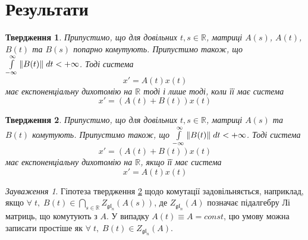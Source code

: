 \documentclass[14pt]{extarticle} %
\let\oldforall\forall
\renewcommand{\forall}{\oldforall\;}
\newtheorem{proposition}{Твердження}
\theoremstyle{remark}
\newtheorem{remark}{Зауваження}
\begin{document}
\section{Результати}
\begin{proposition}\label{weak}Припустимо, що для довільних $t,s\in\mathbb{R}$, матриці $A(s)$, $A(t)$, $B(t)$ та $B(s)$ попарно комутують.
	Припустимо також, що $\int_{-\infty}^\infty\mynorm{B(t)}\;dt<+\infty$. Тоді система 
	\begin{equation}\label{Unperturbed}
	x'=A(t)x(t)
	\end{equation}
	має експоненціальну дихотомію на $\mathbb{R}$ тоді і лише тоді, коли її має система
	\begin{equation}\label{Perturbed}
	x'=(A(t)+B(t))x(t)
	\end{equation}
\end{proposition}
\begin{proposition}
	\label{strong}
	Припустимо, що для довільних $t,s\in\mathbb{R}$, матриці $A(s)$ та $B(t)$ комутують.
	Припустимо також, що $\int_{-\infty}^\infty\mynorm{B(t)}\;dt<+\infty$. Тоді система 
	\begin{equation}\label{Perturbed}
	x'=(A(t)+B(t))x(t)
	\end{equation}
	має експоненціальну дихотомію на $\mathbb{R}$, якщо її має система
	\begin{equation}\label{Unperturbed}
	x'=A(t)x(t)
	\end{equation}
\end{proposition}
\begin{remark}Гіпотеза
	твердження \ref{strong} щодо комутації
	задовільняється, наприклад, якщо $\forall t,\;B(t)\in\bigcap\limits_{s\in\mathbb{R}} Z_{\mathfrak{gl}_n}(A(s))$, де
	$Z_{\mathfrak{gl}_n}(A)$ позначає підалгебру Лі матриць, що комутують з $A$. У випадку $A(t)\equiv A=const$, цю умову
можна записати простіше як $\forall t,\;B(t)\in Z_{\mathfrak{gl}_n}(A)$.\end{remark}
\end{document}
